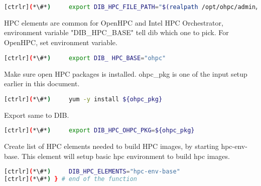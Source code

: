 \begin{lstlisting}[language=bash,keywords={}]
[ctrlr](*\#*)     export DIB_HPC_FILE_PATH="$(realpath /opt/ohpc/admin/dib-chpc/hpc-files/)"
\end{lstlisting}

	HPC elements are common for OpenHPC and Intel HPC Orchestrator, environment variable "DIB\_HPC\_BASE" tell dib which one to pick. For OpenHPC, set environment variable.

\begin{lstlisting}[language=bash,keywords={}]
[ctrlr](*\#*)     export DIB_ HPC_BASE="ohpc"
\end{lstlisting}

	Make sure open HPC packages is installed. ohpc\_pkg is one of the input setup earlier in this document.

\begin{lstlisting}[language=bash,keywords={}]
[ctrlr](*\#*)     yum -y install ${ohpc_pkg}
\end{lstlisting}

	Export same to DIB.

\begin{lstlisting}[language=bash,keywords={}]
[ctrlr](*\#*)     export DIB_HPC_OHPC_PKG=${ohpc_pkg}
\end{lstlisting}

	Create list of HPC elements needed to build HPC images, by starting hpc-env-base. This element will setup basic hpc environment to build hpc images.

\begin{lstlisting}[language=bash,keywords={}]
[ctrlr](*\#*)     DIB_HPC_ELEMENTS="hpc-env-base"
[ctrlr](*\#*) } # end of the function
\end{lstlisting}
